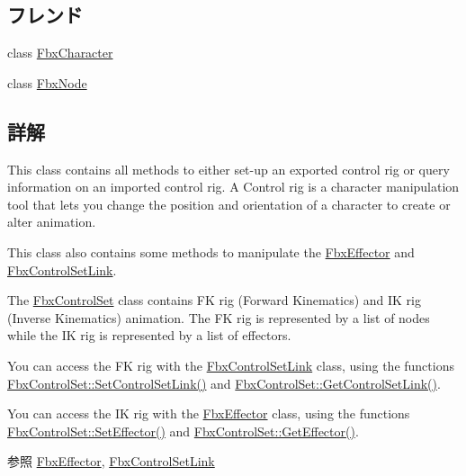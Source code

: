 \subsection*{フレンド}
\begin{DoxyCompactItemize}
\item 
class \hyperlink{class_fbx_control_set_abcc889edc85f236c5ab060bb37663168}{Fbx\+Character}
\item 
class \hyperlink{class_fbx_control_set_a7b27a89b3d5b45cd1a28960c77e4880b}{Fbx\+Node}
\end{DoxyCompactItemize}


\subsection{詳解}
This class contains all methods to either set-\/up an exported control rig or query information on an imported control rig. A Control rig is a character manipulation tool that lets you change the position and orientation of a character to create or alter animation.

This class also contains some methods to manipulate the \hyperlink{class_fbx_effector}{Fbx\+Effector} and \hyperlink{class_fbx_control_set_link}{Fbx\+Control\+Set\+Link}.

The \hyperlink{class_fbx_control_set}{Fbx\+Control\+Set} class contains FK rig (Forward Kinematics) and IK rig (Inverse Kinematics) animation. The FK rig is represented by a list of nodes while the IK rig is represented by a list of effectors.

You can access the FK rig with the \hyperlink{class_fbx_control_set_link}{Fbx\+Control\+Set\+Link} class, using the functions \hyperlink{class_fbx_control_set_a448f77a06237db1189da806fb6d841f1}{Fbx\+Control\+Set\+::\+Set\+Control\+Set\+Link()} and \hyperlink{class_fbx_control_set_aec762ddd33c928ef92493332ad5adcc8}{Fbx\+Control\+Set\+::\+Get\+Control\+Set\+Link()}.

You can access the IK rig with the \hyperlink{class_fbx_effector}{Fbx\+Effector} class, using the functions \hyperlink{class_fbx_control_set_aa274b9d69d66d7d00d7769683e275922}{Fbx\+Control\+Set\+::\+Set\+Effector()} and \hyperlink{class_fbx_control_set_a9783b07eedcb540aff19bf6037070d5e}{Fbx\+Control\+Set\+::\+Get\+Effector()}.

\begin{DoxySeeAlso}{参照}
\hyperlink{class_fbx_effector}{Fbx\+Effector}, \hyperlink{class_fbx_control_set_link}{Fbx\+Control\+Set\+Link} 
\end{DoxySeeAlso}


